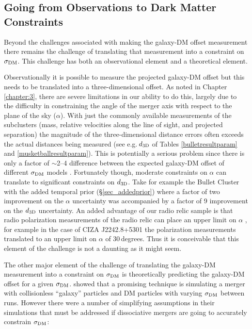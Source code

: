 \subsection{Going from Observations to Dark Matter Constraints}

Beyond the challenges associated with making the galaxy-DM offset measurement there remains the challenge of translating that measurement into a constraint on $\sigma_{\rm DM}$.
This challenge has both an observational element and a theoretical element.

Observationally it is possible to measure the projected galaxy-DM offset but this needs to be translated into a three-dimensional offset.
As noted in Chapter \ref{chapter:3}, there are severe limitations in our ability to do this, largely due to the difficulty in constraining the angle of the merger axis with respect to the plane of the sky ($\alpha$).
With just the commonly available measurements of the subclusters (mass, relative velocities along the line of sight, and projected separation) the magnitude of the three-dimensional distance errors often exceeds the actual distances being measured (see e.g.\,$d_{\rm 3D}$ of Tables \ref{bulletresultparam} and \ref{musketballresultparam}).
This is potentially a serious problem since there is only a factor of $\sim$2--4 difference between the expected galaxy-DM offset of different $\sigma_{\rm DM}$ models \citep{Markevitch:2004dl, Kahlhoefer:2013wp}.
Fortunately though, moderate constraints on $\alpha$ can translate to significant constraints on 
$d_{\rm 3D}$.
Take for example the Bullet Cluster with the added temporal prior (\S\ref{sec_addedprior}) where a factor of two improvement on the $\alpha$ uncertainty was accompanied by a factor of 9 improvement on the $d_{\rm 3D}$ uncertainty.
An added advantage of our radio relic sample is that radio polarization measurements of the radio relic can place an upper limit on $\alpha$ \citep{Ensslin:1998tx}, for example in the case of CIZA J2242.8+5301 the polarization measurements translated to an upper limit on $\alpha$ of 30\,degrees.
Thus it is conceivable that this element of the challenge is not a daunting as it might seem.

The other major element of the challenge of translating the galaxy-DM measurement into a constraint on $\sigma_{\rm DM}$ is theoretically predicting the galaxy-DM offset for a given $\sigma_{\rm DM}$.
\citet{Randall:2008hs} showed that a promising technique is simulating a merger with collisionless ``galaxy'' particles and DM particles with varying $\sigma_{\rm DM}$ between runs.
However there were a number of simplifying assumptions in their simulations that must be addressed if dissociative mergers are going to accurately constrain $\sigma_{\rm DM}$: 

